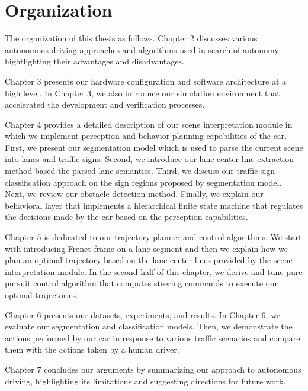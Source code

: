 \section{Organization}

The organization of this thesis as follows. Chapter 2 discusses various
autonomous driving approaches and algorithms used in search of autonomy
hightlighting their advantages and disadvantages.

Chapter 3 presents our hardware configuration and software architecture at a
high level. In Chapter 3, we also introduce our simulation environment that
accelerated the development and verification processes.

Chapter 4 provides a detailed description of our scene interpretation module in
which we implement perception and behavior planning capabilities of the car.
First, we present our segmentation model which is used to parse the current
scene into lanes and traffic signs. Second, we introduce our lane center line
extraction method based the parsed lane semantics. Third, we discuss our
traffic sign classification approach on the sign regions proposed by
segmentation model. Next, we review our obstacle detection method. Finally,
we explain our behavioral layer that implements a hierarchical finite state
machine that regulates the decisions made by the car based on the perception
capabilities.

Chapter 5 is dedicated to our trajectory planner and control algorithms. We
start with introducing Frenet frame on a lane segment and then we explain how
we plan an optimal trajectory based on the lane center lines provided by the
scene interpretation module. In the second half of this chapter, we derive and
tune pure pursuit control algorithm that computes steering commands to execute
our optimal trajectories.

Chapter 6 presents our datasets, experiments, and results. In Chapter 6, we
evaluate our segmentation and classification models. Then, we demonstrate the
actions performed by our car in response to various traffic scenarios and
compare them with the actions taken by a human driver.

Chapter 7 concludes our arguments by summarizing our approach to autonomous
driving, highlighting its limitations and suggesting directions for future
work.
